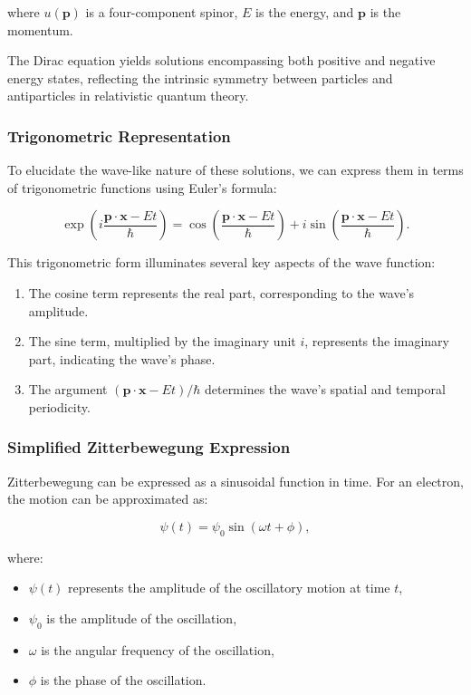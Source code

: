 \documentclass[%
 reprint,
 amsmath,amssymb,
 aps,
]{revtex4-1}
\numberwithin{equation}{section}%
\begin{document}
\noindent where $u(\mathbf{p})$ is a four-component spinor, $E$ is the energy, and $\mathbf{p}$ is the momentum.

The Dirac equation yields solutions encompassing both positive and negative energy states, reflecting the intrinsic symmetry between particles and antiparticles in relativistic quantum theory.

\subsubsection{\label{sec:Trigonometric Representation}Trigonometric Representation}

To elucidate the wave-like nature of these solutions, we can express them in terms of trigonometric functions using Euler's formula:

\begin{equation}
    \exp\left(i\frac{\mathbf{p}\cdot\mathbf{x} - Et}{\hbar}\right) = \cos\left(\frac{\mathbf{p}\cdot\mathbf{x} - Et}{\hbar}\right) + i \sin\left(\frac{\mathbf{p}\cdot\mathbf{x} - Et}{\hbar}\right) .
\end{equation}

This trigonometric form illuminates several key aspects of the wave function:

\begin{enumerate}
    \item The cosine term represents the real part, corresponding to the wave's amplitude.
    \item The sine term, multiplied by the imaginary unit $i$, represents the imaginary part, indicating the wave's phase.
    \item The argument $(\mathbf{p}\cdot\mathbf{x} - Et)/\hbar$ determines the wave's spatial and temporal periodicity.
\end{enumerate}

\subsubsection{\label{sec:Simplified Zitterbewegung Expression}Simplified Zitterbewegung Expression}

Zitterbewegung can be expressed as a sinusoidal function in time. For an electron, the motion can be approximated as:

\begin{equation}
    \psi(t) = \psi_0 \sin(\omega t + \phi),
\end{equation}

\noindent where:
\begin{itemize}
    \item $\psi(t)$ represents the amplitude of the oscillatory motion at time $t$,
    \item $\psi_0$ is the amplitude of the oscillation,
    \item $\omega$ is the angular frequency of the oscillation,
    \item $\phi$ is the phase of the oscillation.
\end{itemize}
\end{document}
